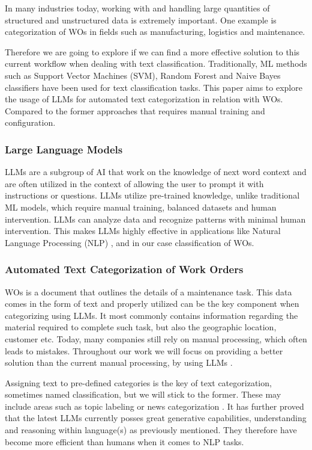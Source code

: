 \documentclass{article}
\begin{document}
In many industries today, working with and handling large quantities of structured and unstructured data is
extremely important.
One example is categorization of WOs in fields such as manufacturing, logistics and maintenance.

Therefore we are going to explore if we can find a more effective solution to this current workflow
when dealing with text classification.
Traditionally, ML methods such as Support Vector Machines (SVM), Random Forest and Naive Bayes classifiers
have been used for text classification tasks.
This paper aims to explore the usage of LLMs for automated text categorization in relation with WOs.
Compared to the former approaches that requires manual training and configuration.

\subsubsection{Large Language Models}

LLMs are a subgroup of AI that work on the knowledge of next word context and are often utilized
in the context of allowing the user to prompt it with instructions or questions.
LLMs utilize pre-trained knowledge, unlike traditional ML models, which require manual training,
balanced datasets and human intervention.
LLMs can analyze data and recognize patterns with minimal human intervention.
This makes LLMs highly effective in applications like Natural Language Processing (NLP) \cite{andersson2024},
and in our case classification of WOs.

\subsubsection{Automated Text Categorization of Work Orders}

WOs is a document that outlines the details of a maintenance task.
This data comes in the form of text and properly utilized can be the key component when categorizing using LLMs.
It most commonly contains information regarding the material required to complete such task,
but also the geographic location, customer etc.
Today, many companies still rely on manual processing, which often leads to mistakes.
Throughout our work we will focus on providing a better solution than the current manual processing,
by using LLMs \cite{ibm2023} \cite{li2024}.

Assigning text to pre-defined categories is the key of text categorization,
sometimes named classification, but we will stick to the former.
These may include areas such as topic labeling or news categorization \cite{zhang2024}.
It has further proved that the latest LLMs currently posses great generative capabilities,
understanding and reasoning within language(s) as previously mentioned.
They therefore have become more efficient than humans when it comes to NLP tasks.
\end{document}
